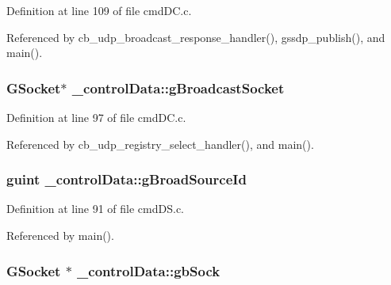 Definition at line 109 of file cmd\+D\+C.\+c.



Referenced by cb\+\_\+udp\+\_\+broadcast\+\_\+response\+\_\+handler(), gssdp\+\_\+publish(), and main().

\hypertarget{struct__control_data_a05fab30fce92ebe541d9dd98220c60ef}{}
\subsubsection[{g\+Broadcast\+Socket}]{\setlength{\rightskip}{0pt plus 5cm}G\+Socket$\ast$ \+\_\+control\+Data\+::g\+Broadcast\+Socket}\label{struct__control_data_a05fab30fce92ebe541d9dd98220c60ef}


Definition at line 97 of file cmd\+D\+C.\+c.



Referenced by cb\+\_\+udp\+\_\+registry\+\_\+select\+\_\+handler(), and main().

\hypertarget{struct__control_data_ae9e5e76959a76812d94ee8f83ae2eef5}{}
\subsubsection[{g\+Broad\+Source\+Id}]{\setlength{\rightskip}{0pt plus 5cm}guint \+\_\+control\+Data\+::g\+Broad\+Source\+Id}\label{struct__control_data_ae9e5e76959a76812d94ee8f83ae2eef5}


Definition at line 91 of file cmd\+D\+S.\+c.



Referenced by main().

\hypertarget{struct__control_data_a3023250e01849cb311a7207746a3b64e}{}
\subsubsection[{gb\+Sock}]{\setlength{\rightskip}{0pt plus 5cm}G\+Socket $\ast$ \+\_\+control\+Data\+::gb\+Sock}\label{struct__control_data_a3023250e01849cb311a7207746a3b64e}


